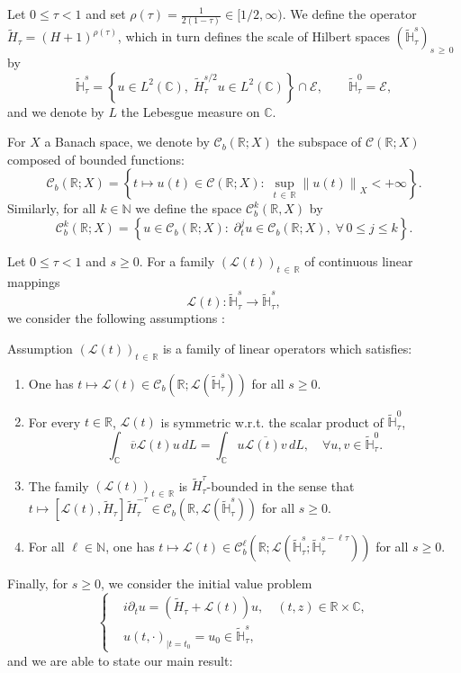 \documentclass[10pt]{amsart}
\theoremstyle{definition}\newtheorem{defi}[theo]{Definition}\newtheorem{rema}[theo]{Remark}\newtheorem{exam}[theo]{Example}\newtheorem{exem}[theo]{Example}\newtheorem{nota}[theo]{Notation}
\newcommand{\C}{\mathbb{C}}
\newcommand{\R}{\mathbb{R}}
\newcommand{\HH}{\mathbb{H}}
\newcommand{\N}{\mathbb{N}}
\newcommand{\E}{\mathcal{E}}
\newcommand{\clL}{\mathcal{L}}
\newcommand{\clC}{\mathcal{C}}
\renewcommand{\L}{\mathscr{L}}
\newcommand{\ov}{\overline}
\newcommand{\wt}{\widetilde}
\newcommand{\<}{\langle}
\renewcommand{\>}{\rangle}
\newcommand*{\romanenumi}{\renewcommand*{\theenumi}{\roman{enumi}}}
\let\oldforall\forall
\renewcommand*{\forall}{\mathrel{\oldforall}}
\begin{document}
Let $0\leq \tau <1$ and set $\rho(\tau)=\frac1{2(1-\tau)} \in [1/2,\infty)$. We define the operator $\wt{H}_\tau=(H+1)^{\rho(\tau)}$, which in turn defines the scale of Hilbert spaces $(\widetilde{\HH}^{s}_\tau)_{s\,\geq\,0}$ by
\[
\widetilde{\HH}_\tau^{s} = \left\{ u\in L^2(\C),\; \wt{H}_\tau^{s/2}u\in L^2(\C)\right\} \cap \E,\qquad \widetilde{\HH}_\tau^{0} =\E,
\]
and we denote by $L$ the Lebesgue measure on $\C$.

For $X$ a Banach space, we denote by $\clC_b(\R;X)$ the subspace of $\clC(\R;X)$ composed of bounded functions:
\[
\clC_b\left(\R ; X\right)= \left\{t\mapsto u(t) \in \clC\left(\R;X\right) :\; \sup_{t\,\in\,\R} \left\|u(t)\right\|_X <+\infty \right\}.
\]
Similarly, for all $k \in \N$ we define the space $\clC^k_b(\R,X)$ by
\[
\clC^k_b\left(\R;X\right)= \left\{ u \in \clC_b\left(\R;X\right) :\; \partial^j_t u \in \clC_b\left(\R;X\right),\; \forall \,0 \leq j \leq k \right\}.
\]

Let $0 \leq\tau <1$ and $s\geq 0$. For a family $(\L(t))_{t\,\in\,\R}$ of continuous linear mappings
\[
\L(t) : \widetilde{\HH}^{s}_\tau\longrightarrow\widetilde{\HH}_\tau^{s},
\]
we consider the following assumptions :

\begin{enonce}{Assumption}\label{assumption1}
$(\L(t))_{t\,\in\,\R}$ is a family of linear operators which satisfies:
\begin{enumerate}\romanenumi
\item\label{assump1.1.1} One has $t\longmapsto \L(t) \in \clC_b(\R; \clL(\widetilde{\HH}_\tau^{s}))$ for all $s \geq 0$.
\item\label{assump1.1.2} For every $t\in \R$, $\L(t)$ is symmetric w.r.t. the scalar product of $\widetilde{\HH}_\tau^{0}$,
\[
\int_{\C} \ov{v} \L(t) u \,dL= \int_{\C} u\ov{ \L(t) v }\,dL, \quad \forall{u,v \in \widetilde{\HH}_\tau^{0}}.
\]
\item\label{assump1.1.3} The family $(\L(t))_{t\,\in\,\R}$ is $\wt{H}_\tau^{\tau}$-bounded in the sense that $t\longmapsto [\L(t), \wt{H}_\tau] \wt{H}_\tau^{-\tau} \in \clC_b(\R,\clL(\widetilde{\HH}_\tau^{s}))$ for all $s
\geq 0$.
\item\label{assump1.1.4} For all $\ell \in \N$, one has $t\longmapsto \L(t) \in \clC^{\ell}_b(\R; \clL(\widetilde{\HH}_\tau^{s} ; \widetilde{\HH}_\tau^{s- \ell \tau}))$ for all $s \geq 0$.
\end{enumerate}
\end{enonce}

Finally, for $s\geq 0$, we consider the initial value problem
\begin{equation}\label{lin-abs}
\left\{
\begin{aligned}
&i\partial_t u=\left(\wt{H}_\tau+\L(t) \right)u, \quad (t,z)\in \R\times \C,\\
&u(t, \cdot)_{|t=t_0}= u_0 \in \widetilde{\HH}_\tau^{s},
\end{aligned}
\right.
\end{equation}
and we are able to state our main result:
\end{document}
